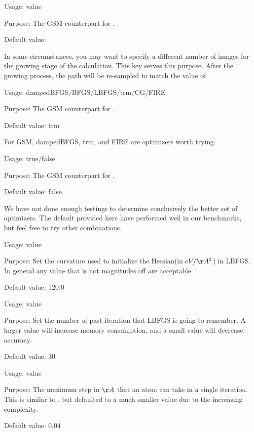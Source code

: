 {
Usage:  value 


Purpose: The GSM counterpart for .


Default value: 
}

In some circumstances, you may want to specify a different number of images for the growing stage of the calculation. This key serves this purpose. After the growing process, the path will be re-sampled to match the value of 

{
Usage:  dampedBFGS/BFGS/LBFGS/trm/CG/FIRE 


Purpose: The GSM counterpart for .


Default value: trm
}

For GSM, dampedBFGS, trm, and FIRE are optimizers worth trying. 

{
Usage:  true/false


Purpose: The GSM counterpart for .


Default value: false
}

We have not done enough testings to determine conclusively the better set of optimizers. The default provided here have performed well in our benchmarks, but feel free to try other combinations.

{
Usage:  value


Purpose: Set the curvature used to initialize the Hessian(in $eV/\AA^{2}$) in LBFGS. In general any value that is not magnitudes off are acceptable. 


Default value: 120.0
}

{
Usage:  value


Purpose: Set the number of past iteration that LBFGS is going to remember. A larger value will increase memory consumption, and a small value will decrease accuracy.


Default value: 30
}

{
Usage:  value


Purpose: The maximum step in $\AA$ that an atom can take in a single iteration. This is similar to , but defaulted to a much smaller value due to the increasing complexity.


Default value: 0.04
}

